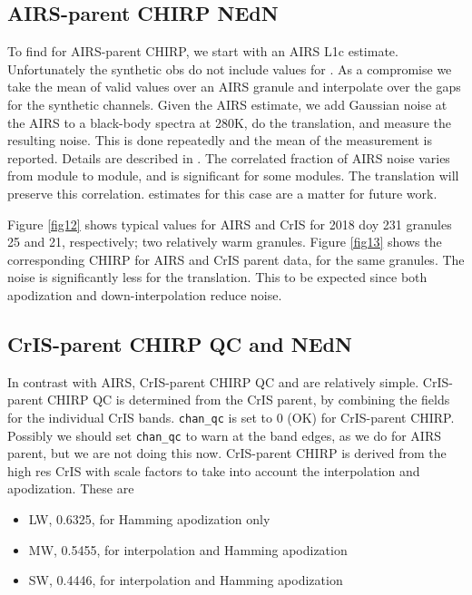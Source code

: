 \documentclass[11pt]{article}
\begin{document}
\subsection{AIRS-parent CHIRP NEdN}

To find {\nedn} for AIRS-parent CHIRP, we start with an AIRS L1c
{\nedn} estimate.  Unfortunately the synthetic obs do not include
values for {\nedn}.  As a compromise we take the mean of valid
{\nedn} values over an AIRS granule and interpolate over the gaps
for the synthetic channels.  Given the AIRS estimate, we add
Gaussian noise at the AIRS {\nedn} to a black-body spectra at 280K,
do the translation, and measure the resulting noise.  This is done
repeatedly and the mean of the measurement is reported.  Details are
described in \cite{mott2018}.  The correlated fraction of AIRS noise
varies from module to module, and is significant for some modules.
The translation will preserve this correlation.  {\nedn} estimates
for this case are a matter for future work.

Figure \ref{fig12} shows typical values for AIRS and CrIS {\nedn}
for 2018 doy 231 granules 25 and 21, respectively; two relatively
warm granules.  Figure \ref{fig13} shows the corresponding CHIRP
{\nedn} for AIRS and CrIS parent data, for the same granules.
The noise is significantly less for the translation.  This to be
expected since both apodization and down-interpolation reduce noise.

\subsection{CrIS-parent CHIRP QC and NEdN}

In contrast with AIRS, CrIS-parent CHIRP QC and {\nedn} are
relatively simple.  CrIS-parent CHIRP QC is determined from the CrIS
parent, by combining the fields for the individual CrIS bands.
\texttt{chan\_qc} is set to 0 (OK) for CrIS-parent CHIRP.  Possibly
we should set \texttt{chan\_qc} to warn at the band edges, as we do
for AIRS parent, but we are not doing this now.  CrIS-parent CHIRP
{\nedn} is derived from the high res CrIS {\nedn} with scale factors
to take into account the interpolation and apodization.  These are
\begin{itemize}
   \item LW, 0.6325, for Hamming apodization only
   \item MW, 0.5455, for interpolation and Hamming apodization
   \item SW, 0.4446, for interpolation and Hamming apodization
\end{itemize}
\end{document}
